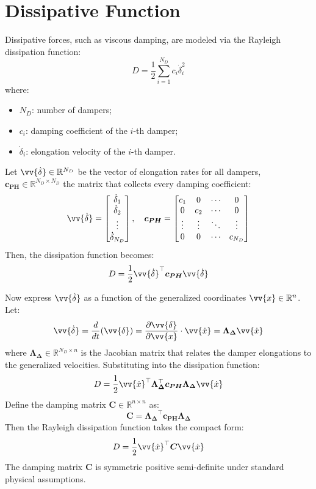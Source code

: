 \section{Dissipative Function}

Dissipative forces, such as viscous damping, are modeled via the Rayleigh dissipation function:
\[
D = \frac{1}{2} \sum_{i=1}^{N_D} c_i \dot{\delta}_i^2
\]
where:

\begin{itemize}
  \item \( N_D \): number of dampers;
  \item \( c_i \): damping coefficient of the \( i \)-th damper;
  \item \( \dot{\delta}_i \): elongation velocity of the \( i \)-th damper.
\end{itemize}

Let \( \vv{\dot{\delta}} \in \mathbb{R}^{N_D} \) be the vector of elongation rates for all dampers, \( \boldsymbol{c_{PH}} \in \mathbb{R}^{N_D \times N_D} \) the matrix that collects every damping coefficient:
\[
\vv{\dot{\delta}} =
\begin{bmatrix}
\dot{\delta}_1 \\
\dot{\delta}_2 \\
\vdots \\
\dot{\delta}_{N_D}
\end{bmatrix}, \quad
\boldsymbol{c_{PH}} =
\begin{bmatrix}
c_1 & 0 & \cdots & 0 \\
0 & c_2 & \cdots & 0\\
\vdots & \vdots  & \ddots & \vdots \\
0  & 0 & \cdots   & c_{N_D}
\end{bmatrix}
\]
Then, the dissipation function becomes:
\[
D = \frac{1}{2} \vv{\dot{\delta}}^\top \boldsymbol{c_{PH}} \vv{\dot{\delta}}
\]

Now express \( \vv{\dot{\delta}} \) as a function of the generalized coordinates \( \vv{x} \in \mathbb{R}^n \). Let:
\[
\vv{\dot{\delta}} = \frac{d}{dt}(\vv{\delta}) = \frac{\partial \vv{\delta}}{\partial \vv{x}} \cdot \vv{\dot{x}} = \boldsymbol{\Lambda_{\Delta}} \vv{\dot{x}}
\]
where \( \boldsymbol{\Lambda_{\Delta}} \in \mathbb{R}^{N_D \times n} \) is the Jacobian matrix that relates the damper elongations to the generalized velocities. Substituting into the dissipation function:
\[
D = \frac{1}{2} \vv{\dot{x}}^\top \boldsymbol{\Lambda_{\Delta}}^\top \boldsymbol{c_{PH}} \boldsymbol{\Lambda_{\Delta}} \vv{\dot{x}}
\]
Define the damping matrix \( \boldsymbol{C} \in \mathbb{R}^{n \times n} \) as:
\[
\boldsymbol{C} = \boldsymbol{\Lambda_{\Delta}}^\top \boldsymbol{c_{PH}} \boldsymbol{\Lambda_{\Delta}}
\]
Then the Rayleigh dissipation function takes the compact form:
\[
D = \frac{1}{2} \vv{\dot{x}}^\top \boldsymbol{C} \vv{\dot{x}}
\]
The damping matrix \( \boldsymbol{C} \) is symmetric positive semi-definite under standard physical assumptions. 

